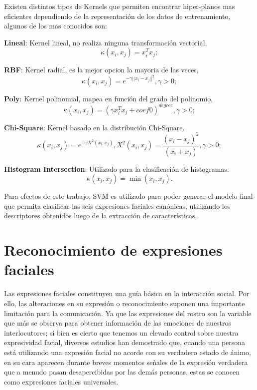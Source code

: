 	Existen distintos tipos de Kernels que permiten encontrar hiper-planos mas eficientes dependiendo de la representación de los datos de entrenamiento, algunos de los mas conocidos son:
	
	\textbf{Lineal}: Kernel lineal, no realiza ninguna transformación vectorial,
	\begin{equation}
	\kappa(x_i,x_j) = x_{i}^{T}x_j;
	\label{k:lineal}
	\end{equation}
	
	\textbf{RBF}: Kernel radial, es la mejor opcion la mayoria de las veces,
	\begin{equation}
	\kappa(x_i,x_j) = e^{-\gamma||x_i - x_j||^2 }, \gamma > 0;
	\label{k:RBF}
	\end{equation}
	
	\textbf{Poly}: Kernel polinomial, mapea en función del grado del polinomio,
	\begin{equation}
	\kappa(x_i,x_j) = (\gamma x_{i}^{T}x_j + coef0)^{degree}, \gamma > 0;
	\label{k:Poly}
	\end{equation}
	
	\textbf{Chi-Square}: Kernel basado en la distribución Chi-Square.
	\begin{equation}
	\kappa(x_i,x_j) = e^{-\gamma X^{2}(x_i,x_j)}, X^{2}(x_i,x_j) = \frac{(x_i - x_j)^2}{(x_i + x_j)}, \gamma > 0;
	\label{k:Sigmoid}
	\end{equation}
	
	\textbf{Histogram Intersection}: Utilizado para la clasificación de histogramas.
	\begin{equation}
	\kappa(x_i,x_j) = \min(x_i,x_j).
	\label{k:Inter}
	\end{equation}


Para efectos de este trabajo, SVM es utilizado para poder generar el modelo final que permita clasificar las seis expresiones faciales canónicas, utilizando los descriptores obtenidos luego de la extracción de características.

\section{Reconocimiento de expresiones faciales}
\label{sec:fer}
Las expresiones faciales constituyen una guía básica en la interacción social. Por ello, las alteraciones en su expresión o reconocimiento suponen una importante limitación para la comunicación. Ya que las expresiones del rostro son la variable que más se observa para obtener información de las emociones de nuestros interlocutores; si bien es cierto que tenemos un elevado control sobre nuestra expresividad facial, diversos estudios han demostrado que, cuando una persona está utilizando una expresión facial no acorde con su verdadero estado de ánimo, en su cara aparecen durante breves momentos señales de la expresión verdadera que a menudo pasan desapercibidas por las demás personas, estas se conocen como expresiones faciales universales.


